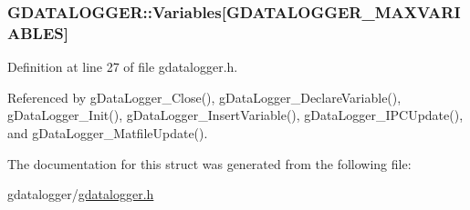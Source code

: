 \hypertarget{structGDATALOGGER_a6af9584d8665205b950cb2dcc5f90a94}{
\subsubsection[{Variables}]{ G\-D\-A\-T\-A\-L\-O\-G\-G\-E\-R\-::\-Variables\mbox{[}{\bf G\-D\-A\-T\-A\-L\-O\-G\-G\-E\-R\-\_\-\-M\-A\-X\-V\-A\-R\-I\-A\-B\-L\-E\-S}\mbox{]}}}\label{structGDATALOGGER_a6af9584d8665205b950cb2dcc5f90a94}


Definition at line 27 of file gdatalogger.\-h.



Referenced by g\-Data\-Logger\-\_\-\-Close(), g\-Data\-Logger\-\_\-\-Declare\-Variable(), g\-Data\-Logger\-\_\-\-Init(), g\-Data\-Logger\-\_\-\-Insert\-Variable(), g\-Data\-Logger\-\_\-\-I\-P\-C\-Update(), and g\-Data\-Logger\-\_\-\-Matfile\-Update().



The documentation for this struct was generated from the following file\-:\begin{DoxyCompactItemize}
\item 
gdatalogger/\hyperlink{gdatalogger_8h}{gdatalogger.\-h}\end{DoxyCompactItemize}
